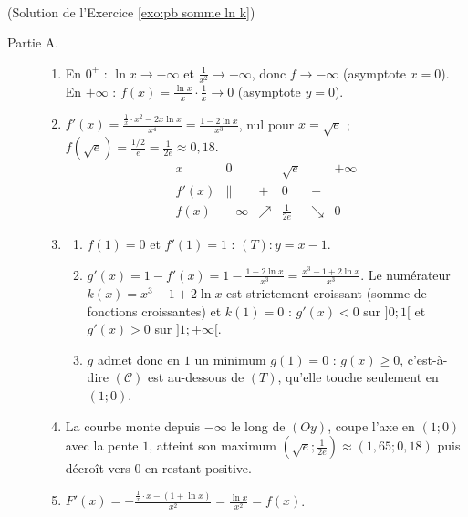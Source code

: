 \begin{corrige}
\begin{sol} ~ \\
(Solution de l'Exercice \ref{exo:pb somme ln k})
\begin{description}
\item[Partie A.] \begin{enumerate}
      \item En $0^+$ : $\ln x \to -\infty$ et $\frac{1}{x^2} \to +\infty$, donc $f \to -\infty$ (asymptote $x = 0$).
            En $+\infty$ : $f(x) = \frac{\ln x}{x} \cdot \frac{1}{x} \to 0$ (asymptote $y = 0$).
      \item $f'(x) = \frac{\frac{1}{x} \cdot x^2 - 2x\ln x}{x^4} = \frac{1 - 2\ln x}{x^3}$, nul pour $x = \sqrt{e}$ ;
            $f(\sqrt{e}) = \frac{1/2}{e} = \frac{1}{2e} \approx 0{,}18$.
            \[
            \begin{array}{c|ccccc}
            x & 0 & & \sqrt{e} & & +\infty \\ \hline
            f'(x) & \| & + & 0 & - & \\ \hline
            f(x) & -\infty & \nearrow & \frac{1}{2e} & \searrow & 0
            \end{array}
            \]
      \item \begin{enumerate}
            \item $f(1) = 0$ et $f'(1) = 1$ : $\boxed{(T) : y = x - 1}$.
            \item $g'(x) = 1 - f'(x) = 1 - \frac{1 - 2\ln x}{x^3} = \frac{x^3 - 1 + 2\ln x}{x^3}$.
                  Le num\'erateur $k(x) = x^3 - 1 + 2\ln x$ est strictement croissant (somme de fonctions croissantes) et $k(1) = 0$ :
                  $g'(x) < 0$ sur $]0 ; 1[$ et $g'(x) > 0$ sur $]1 ; +\infty[$.
            \item $g$ admet donc en $1$ un minimum $g(1) = 0$ : $g(x) \geq 0$, c'est-\`a-dire $(\mathscr{C})$ est au-dessous de $(T)$,
                  qu'elle touche seulement en $(1 ; 0)$.
            \end{enumerate}
      \item La courbe monte depuis $-\infty$ le long de $(Oy)$, coupe l'axe en $(1 ; 0)$ avec la pente $1$, atteint son maximum
            $\left( \sqrt{e} ; \frac{1}{2e} \right) \approx (1{,}65 ; 0{,}18)$ puis d\'ecro\^it vers $0$ en restant positive.
      \item $F'(x) = -\frac{\frac{1}{x} \cdot x - (1 + \ln x)}{x^2} = \frac{\ln x}{x^2} = f(x)$.

\end{enumerate}
\end{description}
\end{sol}
\end{corrige}
